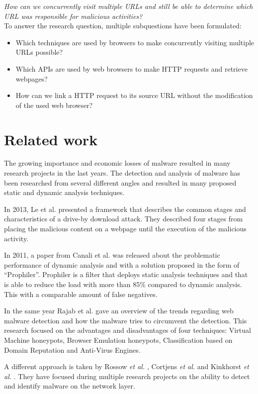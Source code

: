 \documentclass{scrartcl}
\begin{document}
\textit{How can we concurrently visit multiple URLs and still be able to determine which URL was responsible for malicious activities?}\\
\newpage
To answer the research question, multiple subquestions have been formulated:
\begin{itemize}
\item Which techniques are used by browsers to make concurrently visiting multiple URLs possible?
\item Which APIs are used by web browsers to make HTTP requests and retrieve webpages?
\item How can we link a HTTP request to its source URL without the modification of the used web browser?
\end{itemize}

\section{Related work}
The growing importance and economic losses of malware resulted in many research projects in the last years. The detection and analysis of malware has been researched from several different angles \cite{auto_malware,Chang2013} and resulted in many proposed static and dynamic analysis techniques.

In 2013, Le et al. \cite{Le2013} presented a framework that describes the common stages and characteristics of a drive-by download attack. They described four stages from placing the malicious content on a webpage until the execution of the malicious activity.

In 2011, a paper from Canali et al. \cite{Canali2011} was released about the problematic performance of dynamic analysis and with a solution proposed in the form of ``Prophiler''. Prophiler is a filter that deploys static analysis techniques and that is able to reduce the load with more than 85\% compared to dynamic analysis. This with a comparable amount of false negatives.

In the same year Rajab et al. \cite{Rajab11trendsin} gave an overview of the trends regarding web malware detection and how the malware tries to circumvent the detection. This research focused on the advantages and disadvantages of four techniques: Virtual Machine honeypots, Browser Emulation honeypots, Classification based on Domain Reputation and Anti-Virus Engines.

A different approach is taken by Rossow \textit{et al.} \cite{Rossow2011}, Cortjens \textit{et al.} \cite{Cortjens2012} and Kinkhorst \textit{et al.} \cite{Kinkhorst2009}. They have focused during multiple research projects on the ability to detect and identify malware on the network layer.
\end{document}

